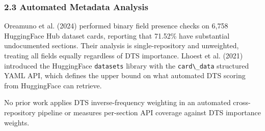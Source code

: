 \subsubsection{2.3 Automated Metadata Analysis}

Oreamuno et al. (2024) performed binary field presence checks on 6,758 HuggingFace Hub dataset cards, reporting that 71.52\% have substantial undocumented sections. Their analysis is single-repository and unweighted, treating all fields equally regardless of DTS importance. Lhoest et al. (2021) introduced the HuggingFace \texttt{datasets} library with the \texttt{card\textbackslash \_data} structured YAML API, which defines the upper bound on what automated DTS scoring from HuggingFace can retrieve.

No prior work applies DTS inverse-frequency weighting in an automated cross-repository pipeline or measures per-section API coverage against DTS importance weights.
